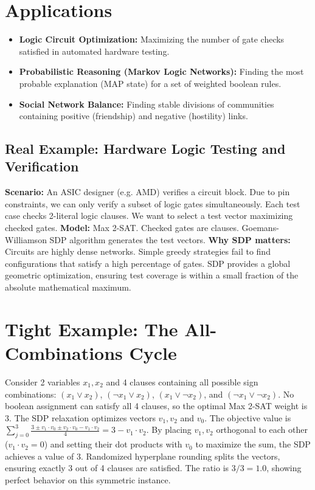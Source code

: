 \documentclass[11pt,oneside]{book}
\begin{document}
\section{Applications}
\begin{itemize}
    \item \textbf{Logic Circuit Optimization:} Maximizing the number of gate checks satisfied in automated hardware testing.
    \item \textbf{Probabilistic Reasoning (Markov Logic Networks):} Finding the most probable explanation (MAP state) for a set of weighted boolean rules.
    \item \textbf{Social Network Balance:} Finding stable divisions of communities containing positive (friendship) and negative (hostility) links.
\end{itemize}

\subsection*{Real Example: Hardware Logic Testing and Verification}
\textbf{Scenario:} An ASIC designer (e.g. AMD) verifies a circuit block. Due to pin constraints, we can only verify a subset of logic gates simultaneously. Each test case checks 2-literal logic clauses. We want to select a test vector maximizing checked gates.
\textbf{Model:} Max 2-SAT. Checked gates are clauses. Goemans-Williamson SDP algorithm generates the test vectors.
\textbf{Why SDP matters:} Circuits are highly dense networks. Simple greedy strategies fail to find configurations that satisfy a high percentage of gates. SDP provides a global geometric optimization, ensuring test coverage is within a small fraction of the absolute mathematical maximum.

\section{Tight Example: The All-Combinations Cycle}
Consider 2 variables $x_1, x_2$ and 4 clauses containing all possible sign combinations: $(x_1 \lor x_2)$, $(\neg x_1 \lor x_2)$, $(x_1 \lor \neg x_2)$, and $(\neg x_1 \lor \neg x_2)$.
No boolean assignment can satisfy all 4 clauses, so the optimal Max 2-SAT weight is 3.
The SDP relaxation optimizes vectors $v_1, v_2$ and $v_0$.
The objective value is $\sum_{j=0}^3 \frac{3 \pm v_1 \cdot v_0 \pm v_2 \cdot v_0 - v_1 \cdot v_2}{4} = 3 - v_1 \cdot v_2$.
By placing $v_1, v_2$ orthogonal to each other ($v_1 \cdot v_2 = 0$) and setting their dot products with $v_0$ to maximize the sum, the SDP achieves a value of 3.
Randomized hyperplane rounding splits the vectors, ensuring exactly 3 out of 4 clauses are satisfied. The ratio is $3/3 = 1.0$, showing perfect behavior on this symmetric instance.
\end{document}
